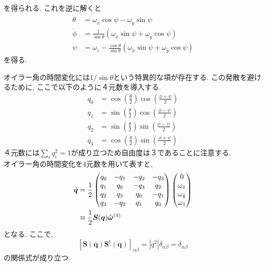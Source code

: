 を得られる. これを逆に解くと
\begin{align}
 \dot{\theta} &= \omega_{\tilde{x}}\cos\psi - \omega_{\tilde{y}}\sin\psi
\label{eq:RigidBodyMD7}
 \\
 \dot{\phi}   &= \frac{1}{\sin\theta}\left(\omega_{\tilde{x}}\sin\psi + \omega_{\tilde{y}} \cos\psi \right)
\label{eq:RigidBodyMD8}
 \\
 \dot{\psi}   &= \omega_{\tilde{z}}- \frac{\cos\theta}{\sin\theta}\left(\omega_{\tilde{x}}\sin\psi + \omega_{\tilde{y}} \cos\psi \right)
 \label{eq:RigidBodyMD9}
\end{align}
を得る. 

オイラー角の時間変化には$1/\sin \theta$という特異的な項が存在する. 
この発散を避けるために, ここで以下のように４元数を導入する. 
\begin{align}
 q_0 & = \cos\left(\frac{\theta}{2}\right)\cos\left(\frac{\phi+\psi}{2}\right)
 \label{eq:RigidBodyMD10}
 \\
 q_1 & = \sin\left(\frac{\theta}{2}\right)\cos\left(\frac{\phi-\psi}{2}\right)
 \label{eq:RigidBodyMD11}
 \\
 q_2 & = \sin\left(\frac{\theta}{2}\right)\sin\left(\frac{\phi-\psi}{2}\right)
\label{eq:RigidBodyMD12}
 \\
 q_3 & = \cos\left(\frac{\theta}{2}\right)\sin\left(\frac{\phi+\psi}{2}\right) 
\label{eq:RigidBodyMD13}
\end{align}
４元数には$\sum_{i}q_{i}^{2}=1$が成り立つため自由度は３であることに注意する. \\
オイラー角の時間変化を4元数を用いて表すと, 
\begin{align}
 \dot{\bm{q}}
  &=
  \frac{1}{2}
    \begin{pmatrix}
     q_{0} & -q_{1} & -q_{2} & -q_{3} \\
     q_{1} &  q_{0} & -q_{3} &  q_{2} \\
     q_{2} &  q_{3} &  q_{0} & -q_{1} \\
     q_{3} & -q_{2} &  q_{1} &  q_{0} \\
    \end{pmatrix}
 \begin{pmatrix}
  0                  \\
  \omega_{\Tilde{x}} \\
  \omega_{\Tilde{y}} \\
  \omega_{\Tilde{z}} \\
 \end{pmatrix}
\label{eq:RigidBodyMD14}
 \\
 &\equiv
 \frac{1}{2} \bm{S}(\bm{q}) \Tilde{\bm{\bm{\omega}}}^{(4)}
\label{eq:RigidBodyMD15}
\end{align}
となる. ここで, 
\begin{equation}
 \left[
  \bm{S}(\bm{q})\bm{S}^{\mathrm{t}}(\bm{q})
 \right]_{\alpha \beta}
 =
 |q^{2}| \delta_{\alpha \beta}
 =
 \delta_{\alpha \beta}
\label{eq:RigidBodyMD16}
\end{equation}
の関係式が成り立つ. 


